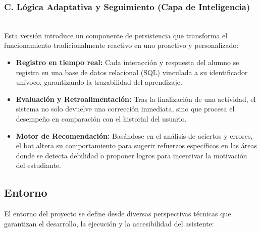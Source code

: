 \documentclass[a4paper,12pt,twoside,final]{book}
\begin{document}
\subsubsection*{C. Lógica Adaptativa y Seguimiento (Capa de Inteligencia)}
\\
Esta versión introduce un componente de persistencia que transforma el funcionamiento tradicionalmente reactivo en uno proactivo y personalizado:
\begin{itemize}
    \item \textbf{Registro en tiempo real:} Cada interacción y respuesta del alumno se registra en una base de datos relacional (SQL) vinculada a su identificador unívoco, garantizando la trazabilidad del aprendizaje.
    \item \textbf{Evaluación y Retroalimentación:} Tras la finalización de una actividad, el sistema no solo devuelve una corrección inmediata, sino que procesa el desempeño en comparación con el historial del usuario.
    \item \textbf{Motor de Recomendación:} Basándose en el análisis de aciertos y errores, el bot altera su comportamiento para sugerir refuerzos específicos en las áreas donde se detecta debilidad o proponer logros para incentivar la motivación del estudiante.
\end{itemize}

\subsection{Entorno}

El entorno del proyecto se define desde diversas perspectivas técnicas que garantizan el desarrollo, la ejecución y la accesibilidad del asistente:
\end{document}
